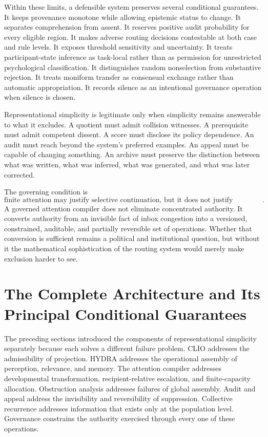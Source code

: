 \documentclass[11pt]{article}
\theoremstyle{definition}
\begin{document}
Within these limits, a defensible system preserves several conditional guarantees. It keeps provenance monotone while allowing epistemic status to change. It separates comprehension from assent. It reserves positive audit probability for every eligible region. It makes adverse routing decisions contestable at both case and rule levels. It exposes threshold sensitivity and uncertainty. It treats participant-state inference as task-local rather than as permission for unrestricted psychological classification. It distinguishes random nonselection from substantive rejection. It treats moniform transfer as consensual exchange rather than automatic appropriation. It records silence as an intentional governance operation when silence is chosen.

Representational simplicity is legitimate only when simplicity remains answerable to what it excludes. A quotient must admit collision witnesses. A prerequisite must admit competent dissent. A score must disclose its policy dependence. An audit must reach beyond the system's preferred examples. An appeal must be capable of changing something. An archive must preserve the distinction between what was written, what was inferred, what was generated, and what was later corrected.

The governing condition is
\[
\text{finite attention may justify selective continuation, but it does not justify untraceable transformation}.
\]
A governed attention compiler does not eliminate concentrated authority. It converts authority from an invisible fact of inbox congestion into a versioned, constrained, auditable, and partially reversible set of operations. Whether that conversion is sufficient remains a political and institutional question, but without it the mathematical sophistication of the routing system would merely make exclusion harder to see.

\section{The Complete Architecture and Its Principal Conditional Guarantees}

The preceding sections introduced the components of representational simplicity separately because each solves a different failure problem. CLIO addresses the admissibility of projection. HYDRA addresses the operational assembly of perception, relevance, and memory. The attention compiler addresses developmental transformation, recipient-relative escalation, and finite-capacity allocation. Obstruction analysis addresses failures of global assembly. Audit and appeal address the invisibility and reversibility of suppression. Collective recurrence addresses information that exists only at the population level. Governance constrains the authority exercised through every one of these operations.
\end{document}
